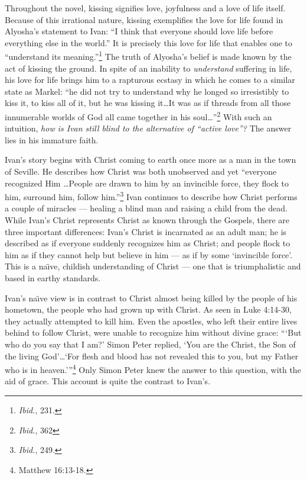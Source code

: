 Throughout the novel, kissing signifies love, joyfulness and a love of life itself. Because of this irrational nature, kissing exemplifies the love for life found in Alyosha's statement to Ivan: ``I think that everyone should love life before everything else in the world.'' It is precisely this love for life that enables one to ``understand its meaning.''\footnote{\emph{Ibid.}, 231.} The truth of Alyosha's belief is made known by the act of kissing the ground. In spite of an inability to \emph{understand} suffering in life, his love for life brings him to a rapturous ecstasy in which he comes to a similar state as Markel: ``he did not try to understand why he longed so irresistibly to kiss it, to kiss all of it, but he was kissing it\ldots It was as if threads from all those innumerable worlds of God all came together in his soul\ldots''\footnote{\emph{Ibid.}, 362} With such an intuition, \emph{how is Ivan still blind to the alternative of ``active love''?} The answer lies in his immature faith.

Ivan's story begins with Christ coming to earth once more as a man in the town of Seville. He describes how Christ was both unobserved and yet ``everyone recognized Him \ldots People are drawn to him by an invincible force, they flock to him, surround him, follow him.''\footnote{\emph{Ibid.}, 249.} Ivan continues to describe how Christ performs a couple of miracles --- healing a blind man and raising a child from the dead. While Ivan's Christ represents Christ as known through the Gospels, there are three important differences: Ivan's Christ is incarnated as an adult man; he is described as if everyone suddenly recognizes him as Christ; and people flock to him as if they cannot help but believe in him --- as if by some `invincible force'. This is a na\"{\i}ve, childish understanding of Christ --- one that is triumphalistic and based in earthy standards. 

Ivan's na\"{\i}ve view is in contrast to Christ almost being killed by the people of his hometown, the people who had grown up with Christ. As seen in Luke 4:14-30, they actually attempted to kill him. Even the apostles, who left their entire lives behind to follow Christ, were unable to recognize him without divine grace: ``\thinspace`But who do you say that I am?' Simon Peter replied, `You are the Christ, the Son of the living God'\ldots `For flesh and blood has not revealed this to you, but my Father who is in heaven.'\thinspace''\footnote{Matthew 16:13-18.} Only Simon Peter knew the answer to this question, with the aid of grace. This account is quite the contrast to Ivan's.

